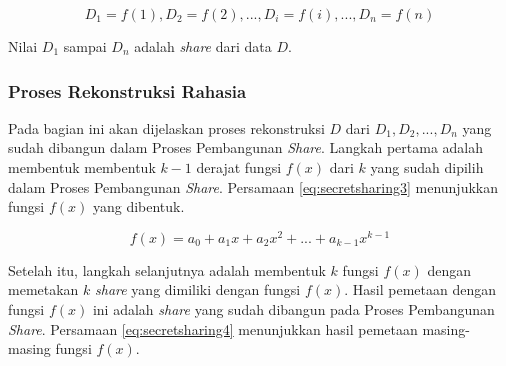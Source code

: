 \begin{equation}
	D_1 = f(1), D_2 = f(2), ..., D_i = f(i), ..., D_n = f(n) \label{eq:secretsharing2}
\end{equation}

Nilai \begin{math}D_1\end{math} sampai \begin{math}D_n\end{math} adalah \textit{share} dari data \begin{math}D\end{math}.

\subsubsection{Proses Rekonstruksi Rahasia}

Pada bagian ini akan dijelaskan proses rekonstruksi \begin{math}D\end{math} dari \begin{math}D_1, D_2, ..., D_n\end{math} yang sudah dibangun dalam Proses Pembangunan \textit{Share}. Langkah pertama adalah membentuk membentuk \begin{math}k-1\end{math} derajat fungsi \begin{math}f(x)\end{math} dari \begin{math}k\end{math} yang sudah dipilih dalam Proses Pembangunan \textit{Share}. Persamaan \ref{eq:secretsharing3} menunjukkan fungsi \begin{math}f(x)\end{math} yang dibentuk.

\begin{equation}
	f(x) = a_0 + a_1x + a_2x^2 + ... + a_{k-1}x^{k-1} \label{eq:secretsharing3}
\end{equation}

Setelah itu, langkah selanjutnya adalah membentuk \begin{math}k\end{math} fungsi \begin{math}f(x)\end{math} dengan memetakan \begin{math}k\end{math} \textit{share} yang dimiliki dengan fungsi \begin{math}f(x)\end{math}. Hasil pemetaan dengan fungsi \begin{math}f(x)\end{math} ini adalah \textit{share} yang sudah dibangun pada Proses Pembangunan \textit{Share}. Persamaan \ref{eq:secretsharing4} menunjukkan hasil pemetaan masing-masing fungsi \begin{math}f(x)\end{math}.

